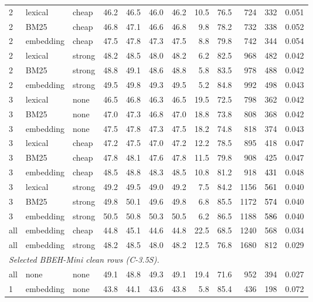 \begin{longtable}{lllrrrrrrrrr}
2 & lexical & cheap & 46.2 & 46.5 & 46.0 & 46.2 & 10.5 & 76.5 & 724 & 332 & 0.051 \\
2 & BM25 & cheap & 46.8 & 47.1 & 46.6 & 46.8 & 9.8 & 78.2 & 732 & 338 & 0.052 \\
\rowcolor{tracesoft}
2 & embedding & cheap & 47.5 & 47.8 & 47.3 & 47.5 & 8.8 & 79.8 & 742 & 344 & 0.054 \\
2 & lexical & strong & 48.2 & 48.5 & 48.0 & 48.2 & 6.2 & 82.5 & 968 & 482 & 0.042 \\
2 & BM25 & strong & 48.8 & 49.1 & 48.6 & 48.8 & 5.8 & 83.5 & 978 & 488 & 0.042 \\
2 & embedding & strong & 49.5 & 49.8 & 49.3 & 49.5 & 5.2 & 84.8 & 992 & 498 & 0.043 \\
\midrule
3 & lexical & none & 46.5 & 46.8 & 46.3 & 46.5 & 19.5 & 72.5 & 798 & 362 & 0.042 \\
3 & BM25 & none & 47.0 & 47.3 & 46.8 & 47.0 & 18.8 & 73.8 & 808 & 368 & 0.042 \\
3 & embedding & none & 47.5 & 47.8 & 47.3 & 47.5 & 18.2 & 74.8 & 818 & 374 & 0.043 \\
3 & lexical & cheap & 47.2 & 47.5 & 47.0 & 47.2 & 12.2 & 78.5 & 895 & 418 & 0.047 \\
3 & BM25 & cheap & 47.8 & 48.1 & 47.6 & 47.8 & 11.5 & 79.8 & 908 & 425 & 0.047 \\
3 & embedding & cheap & 48.5 & 48.8 & 48.3 & 48.5 & 10.8 & 81.2 & 918 & \textcolor{black}{431} & 0.048 \\
3 & lexical & strong & 49.2 & 49.5 & 49.0 & 49.2 & 7.5 & 84.2 & 1156 & \textcolor{black}{561} & 0.040 \\
3 & BM25 & strong & 49.8 & 50.1 & 49.6 & 49.8 & 6.8 & 85.5 & 1172 & \textcolor{black}{574} & 0.040 \\
3 & embedding & strong & 50.5 & 50.8 & 50.3 & 50.5 & 6.2 & 86.5 & 1188 & \textcolor{black}{586} & 0.040 \\
\midrule
all & embedding & cheap & 44.8 & 45.1 & 44.6 & 44.8 & 22.5 & 68.5 & 1240 & 568 & 0.034 \\
all & embedding & strong & 48.2 & 48.5 & 48.0 & 48.2 & 12.5 & 76.8 & 1680 & 812 & 0.029 \\
\midrule
\multicolumn{12}{l}{\emph{Selected BBEH-Mini clean rows (C-3.5S).}} \\
all & none & none & 49.1 & 48.8 & 49.3 & 49.1 & 19.4 & 71.6 & 952 & 394 & 0.027 \\
1 & embedding & none & 43.8 & 44.1 & 43.6 & 43.8 & 5.8 & 85.4 & 436 & 198 & 0.072 \\

\end{longtable}
